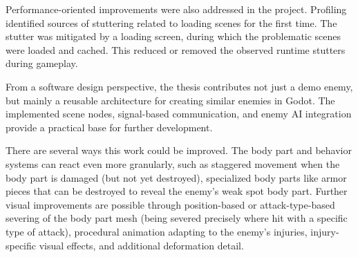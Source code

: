 Performance-oriented improvements were also addressed in the project. Profiling identified sources of stuttering related to loading scenes for the first time. The stutter was mitigated by a loading screen, during which the problematic scenes were loaded and cached. This reduced or removed the observed runtime stutters during gameplay.

From a software design perspective, the thesis contributes not just a demo enemy, but mainly a reusable architecture for creating similar enemies in Godot. The implemented scene nodes, signal-based communication, and enemy AI integration provide a practical base for further development.

There are several ways this work could be improved. The body part and behavior systems can react even more granularly, such as staggered movement when the body part is damaged (but not yet destroyed), specialized body parts like armor pieces that can be destroyed to reveal the enemy's weak spot body part. Further visual improvements are possible through position-based or attack-type-based severing of the body part mesh (being severed precisely where hit with a specific type of attack), procedural animation adapting to the enemy's injuries, injury-specific visual effects, and additional deformation  detail.
